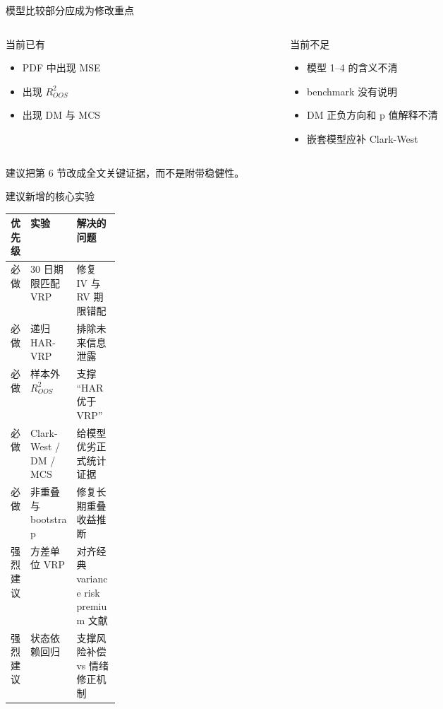 \documentclass[UTF8,aspectratio=169]{ctexbeamer}
\begin{document}
\begin{frame}{模型比较部分应成为修改重点}
  \begin{columns}[T,totalwidth=\linewidth]
    \begin{column}{0.48\linewidth}
      \begin{block}{当前已有}
        \begin{itemize}
          \item PDF 中出现 MSE
          \item 出现 $R^2_{OOS}$
          \item 出现 DM 与 MCS
        \end{itemize}
      \end{block}
    \end{column}
    \begin{column}{0.48\linewidth}
      \begin{alertblock}{当前不足}
        \begin{itemize}
          \item 模型 1--4 的含义不清
          \item benchmark 没有说明
          \item DM 正负方向和 p 值解释不清
          \item 嵌套模型应补 Clark-West
        \end{itemize}
      \end{alertblock}
    \end{column}
  \end{columns}

  \vspace{0.25cm}
  建议把第 6 节改成全文关键证据，而不是附带稳健性。
\end{frame}

\begin{frame}{建议新增的核心实验}
  \small
  \begin{tabularx}{\linewidth}{@{}p{0.18\linewidth}Y Y@{}}
    \toprule
    优先级 & 实验 & 解决的问题 \\
    \midrule
    必做 & 30 日期限匹配 VRP & 修复 IV 与 RV 期限错配 \\
    必做 & 递归 HAR-VRP & 排除未来信息泄露 \\
    必做 & 样本外 $R^2_{OOS}$ & 支撑 ``HAR 优于 VRP'' \\
    必做 & Clark-West / DM / MCS & 给模型优劣正式统计证据 \\
    必做 & 非重叠与 bootstrap & 修复长期重叠收益推断 \\
    强烈建议 & 方差单位 VRP & 对齐经典 variance risk premium 文献 \\
    强烈建议 & 状态依赖回归 & 支撑风险补偿 vs 情绪修正机制 \\
    \bottomrule
  \end{tabularx}
\end{frame}
\end{document}
